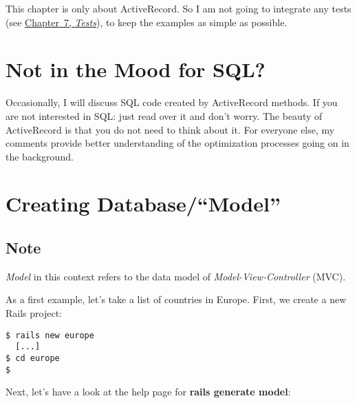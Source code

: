\documentclass[a4paper]{book}
\newcounter{tab}[chapter]
\begin{document}
This chapter is only about ActiveRecord. So I am not going to integrate any tests (see \hyperref[testing]{Chapter~7, \emph{Tests}}), to keep the examples as simple as possible.

\section{Not in the Mood for SQL?}\label{not-in-the-mood-for-sql}

Occasionally, I will discuss SQL code created by ActiveRecord methods. If you are not interested in SQL: just read over it and don't worry. The beauty of ActiveRecord is that you do not need to think about it. For everyone else, my comments provide better understanding of the optimization processes going on in the background.

\section{Creating Database/“Model”}\label{creating-databasemodel}

\subsection{Note}\label{note-22}

\emph{Model} in this context refers to the data model of \emph{Model-View-Controller} (MVC).

As a first example, let's take a list of countries in Europe. First, we create a new Rails project:

\begin{shaded}\begin{verbatim}
$ rails new europe
  [...]
$ cd europe
$
\end{verbatim}\end{shaded}

Next, let's have a look at the help page for \textbf{rails generate model}:
\end{document}
